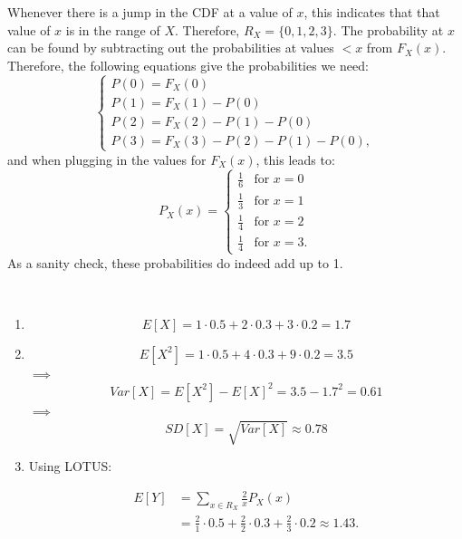 \begin{problem}{13}  Whenever there is a jump in the CDF at a value of $x$, this indicates that that value of $x$ is in the range of $X$.  Therefore, $R_X=\{0, 1, 2, 3 \}$.  The probability at $x$ can be found by subtracting out the probabilities at values $<x$ from $F_X(x)$.  Therefore, the following equations give the probabilities we need:
\[
  \begin{cases}
                                   P(0)=F_X(0) \\
                                    P(1)=F_X(1)-P(0) \\
                                    P(2)=F_X(2)-P(1)-P(0) \\
                                    P(3)=F_X(3)-P(2)-P(1) -P(0),
  \end{cases}
\]
and when plugging in the values for $F_X(x)$, this leads to:
\[
  P_X(x) =
  \begin{cases}
                                   \frac{1}{6} & \text{for $x=0$} \\
                                   \frac{1}{3} & \text{for $x=1$} \\
                                   \frac{1}{4} & \text{for $x=2$} \\
                                   \frac{1}{4} & \text{for $x=3$}.
  \end{cases}
\]
As a sanity check, these probabilities do indeed add up to 1.



\end{problem}

\begin{problem}{14} $ $

\begin{enumerate}
\item
\begin{equation*}
E[X]  = 1\cdot 0.5+2\cdot 0.3+3\cdot 0.2 =1.7
\end{equation*}

\item 
\begin{equation*}
E[X^2] = 1\cdot 0.5+4\cdot 0.3+9\cdot 0.2 =3.5
\end{equation*}
$\implies$
\begin{equation*}
Var[X] = E[X^2]-E[X]^2 = 3.5-1.7^2=0.61
\end{equation*}
$\implies$
\begin{equation*}
SD[X] =\sqrt{Var[X]} \approx 0.78
\end{equation*}

\item Using LOTUS:

\begin{align*}
E[Y] & = \sum_{x \in R_X} \frac{2}{x} P_X(x) \\
& = \frac{2}{1}\cdot 0.5+\frac{2}{2}\cdot 0.3+\frac{2}{3}\cdot 0.2 \approx 1.43.
\end{align*}


\end{enumerate}

\end{problem}


